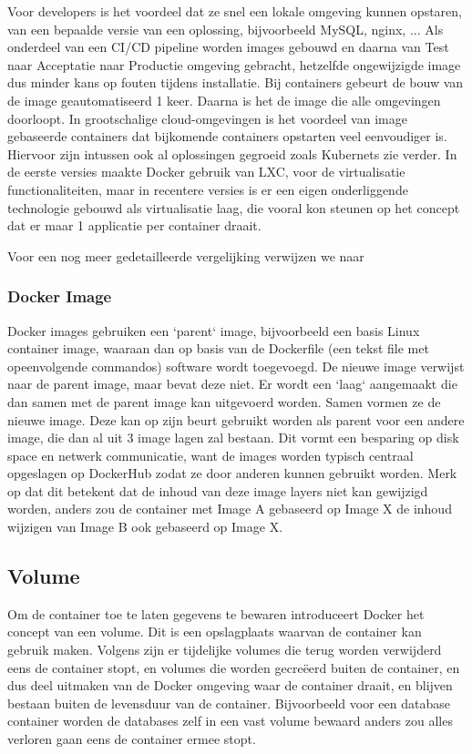 \newline
Voor developers is het voordeel dat ze snel een lokale omgeving kunnen opstaren, van een bepaalde versie van een oplossing, bijvoorbeeld MySQL, nginx, ...
Als onderdeel van een CI/CD pipeline worden images gebouwd en daarna van Test naar Acceptatie naar Productie omgeving gebracht, hetzelfde ongewijzigde image dus minder kans op fouten tijdens installatie. Bij containers gebeurt de bouw van de image geautomatiseerd 1 keer. Daarna is het de image die alle omgevingen doorloopt.
\newline
In grootschalige cloud-omgevingen is het voordeel van image gebaseerde containers dat bijkomende containers opstarten veel eenvoudiger is. Hiervoor zijn intussen ook al oplossingen gegroeid zoals Kubernets zie verder.
\newline
In de eerste versies maakte Docker gebruik van LXC, voor de virtualisatie functionaliteiten, maar in recentere versies is er een eigen onderliggende technologie gebouwd als virtualisatie laag, die vooral kon steunen op het concept dat er maar 1 applicatie per container draait. 
\newline
\newline

Voor een nog meer gedetailleerde vergelijking verwijzen we naar \textcite{Tunggal2023}

\subsubsection{Docker Image}
Docker images gebruiken een `parent` image, bijvoorbeeld een basis Linux container image, waaraan dan op basis van de Dockerfile (een tekst file met opeenvolgende commandos) software wordt toegevoegd. De nieuwe image verwijst naar de parent image, maar bevat deze niet. Er wordt een `laag` aangemaakt die dan samen met de parent image kan uitgevoerd worden. Samen vormen ze de nieuwe image.
Deze kan op zijn beurt gebruikt worden als parent voor een andere image, die dan al uit 3 image lagen zal bestaan. Dit vormt een besparing op disk space en netwerk communicatie, want de images worden typisch centraal opgeslagen op DockerHub zodat ze door anderen kunnen gebruikt worden.
Merk op dat dit betekent dat de inhoud van deze image layers niet kan gewijzigd worden, anders zou de container met Image A gebaseerd op Image X de inhoud wijzigen van Image B ook gebaseerd op Image X. 

\subsection{Volume}
Om de container toe te laten gegevens te bewaren introduceert Docker het concept van een volume. Dit is een opslagplaats waarvan de container kan gebruik maken. Volgens  \textcite{Frieze2022} zijn er tijdelijke volumes die terug worden verwijderd eens de container stopt, en volumes die worden gecreëerd buiten de container, en dus deel uitmaken van de Docker omgeving waar de container draait, en blijven bestaan buiten de levensduur van de container.
\newline
Bijvoorbeeld voor een database container worden de databases zelf in een vast volume bewaard anders zou alles verloren gaan eens de container ermee stopt.

